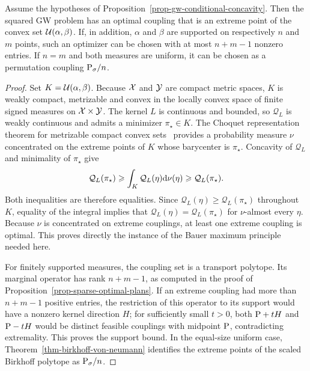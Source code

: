 \begin{prop}\label{prop-gw-extreme-optimal-coupling}
	Assume the hypotheses of Proposition~\ref{prop-gw-conditional-concavity}. Then the squared GW problem has an optimal coupling that is an extreme point of the convex set $\Couplings(\alpha,\beta)$. If, in addition, $\alpha$ and $\beta$ are supported on respectively $n$ and $m$ points, such an optimizer can be chosen with at most $n+m-1$ nonzero entries. If $n=m$ and both measures are uniform, it can be chosen as a permutation coupling $\P_\sigma/n$.
\end{prop}
\begin{proof}
	Set $K=\Couplings(\alpha,\beta)$. Because $\X$ and $\Y$ are compact metric spaces, $K$ is weakly compact, metrizable and convex in the locally convex space of finite signed measures on $\X\times\Y$. The kernel $L$ is continuous and bounded, so $\mathcal Q_L$ is weakly continuous and admits a minimizer $\pi_\star\in K$. The Choquet representation theorem for metrizable compact convex sets~\cite{Phelps2001Choquet} provides a probability measure $\nu$ concentrated on the extreme points of $K$ whose barycenter is $\pi_\star$. Concavity of $\mathcal Q_L$ and minimality of $\pi_\star$ give
	\[
		\mathcal Q_L(\pi_\star)
		\geq
		\int_K\mathcal Q_L(\eta)\d\nu(\eta)
		\geq
		\mathcal Q_L(\pi_\star).
	\]
	Both inequalities are therefore equalities. Since $\mathcal Q_L(\eta)\geq\mathcal Q_L(\pi_\star)$ throughout $K$, equality of the integral implies that $\mathcal Q_L(\eta)=\mathcal Q_L(\pi_\star)$ for $\nu$-almost every $\eta$. Because $\nu$ is concentrated on extreme couplings, at least one extreme coupling is optimal. This proves directly the instance of the Bauer maximum principle needed here.

	For finitely supported measures, the coupling set is a transport polytope. Its marginal operator has rank $n+m-1$, as computed in the proof of Proposition~\ref{prop-sparse-optimal-plans}. If an extreme coupling had more than $n+m-1$ positive entries, the restriction of this operator to its support would have a nonzero kernel direction $H$; for sufficiently small $t>0$, both $\P+tH$ and $\P-tH$ would be distinct feasible couplings with midpoint $\P$, contradicting extremality. This proves the support bound. In the equal-size uniform case, Theorem~\ref{thm-birkhoff-von-neumann} identifies the extreme points of the scaled Birkhoff polytope as $\P_\sigma/n$.
\end{proof}

